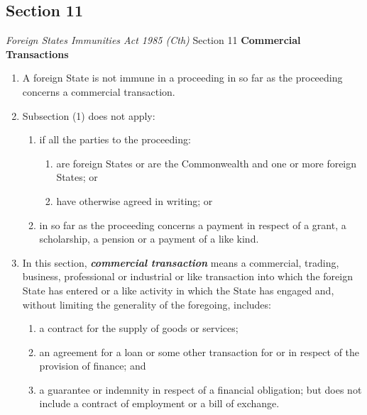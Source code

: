 \subsection{Section 11}
\begin{statutedetails}{\textit{Foreign States Immunities Act 1985 (Cth)} Section 11}
    \flushleft
    \textbf{Commercial Transactions}

    \begin{enumerate}[label=(\arabic*)]
        \item A foreign State is not immune in a proceeding in so far as the proceeding concerns a commercial transaction.
        \item Subsection (1) does not apply:
        \begin{enumerate}
            \item if all the parties to the proceeding:
            \begin{enumerate}[label=(\roman*)]
                \item are foreign States or are the Commonwealth and one or more foreign States; or
                \item have otherwise agreed in writing; or
            \end{enumerate}
            \item in so far as the proceeding concerns a payment in respect of a grant, a scholarship, a pension or a payment of a like kind.
        \end{enumerate}
        \item In this section, \textit{\textbf{commercial transaction}} means a commercial, trading, business, professional or industrial or like transaction into which the foreign State has entered or a like activity in which the State has engaged and, without limiting the generality of the foregoing, includes:
        \begin{enumerate}[label=(\alph*)]
            \item a contract for the supply of goods or services;
            \item an agreement for a loan or some other transaction for or in respect of the provision of finance; and
            \item a guarantee or indemnity in respect of a financial obligation; but does not include a contract of employment or a bill of exchange.
        \end{enumerate} 
    \end{enumerate}
\end{statutedetails}

